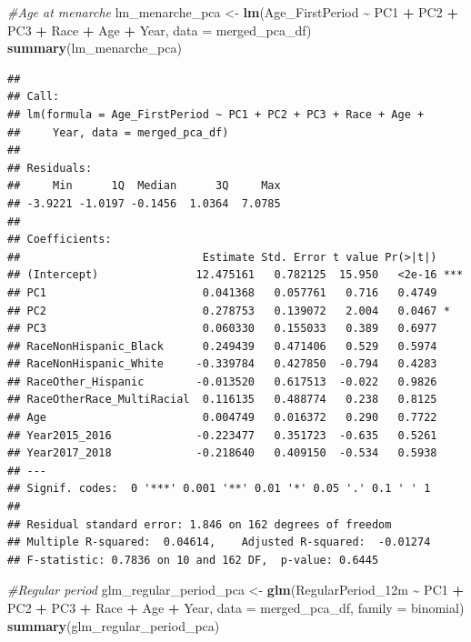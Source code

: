\documentclass[
]{article}
\newenvironment{Shaded}{\begin{snugshade}}{\end{snugshade}}
\newcommand{\AttributeTok}[1]{\textcolor[rgb]{0.13,0.29,0.53}{#1}}
\newcommand{\CommentTok}[1]{\textcolor[rgb]{0.56,0.35,0.01}{\textit{#1}}}
\newcommand{\FunctionTok}[1]{\textcolor[rgb]{0.13,0.29,0.53}{\textbf{#1}}}
\newcommand{\NormalTok}[1]{#1}
\newcommand{\OtherTok}[1]{\textcolor[rgb]{0.56,0.35,0.01}{#1}}
\newcommand{\SpecialCharTok}[1]{\textcolor[rgb]{0.81,0.36,0.00}{\textbf{#1}}}
\begin{document}
\begin{Shaded}
\begin{Highlighting}[]
\CommentTok{\#Age at menarche}
\NormalTok{lm\_menarche\_pca }\OtherTok{\textless{}{-}} \FunctionTok{lm}\NormalTok{(Age\_FirstPeriod }\SpecialCharTok{\textasciitilde{}}\NormalTok{ PC1 }\SpecialCharTok{+}\NormalTok{ PC2 }\SpecialCharTok{+}\NormalTok{ PC3 }\SpecialCharTok{+}\NormalTok{ Race }\SpecialCharTok{+}\NormalTok{ Age }\SpecialCharTok{+}\NormalTok{ Year, }
                                \AttributeTok{data =}\NormalTok{ merged\_pca\_df)}
\FunctionTok{summary}\NormalTok{(lm\_menarche\_pca)}
\end{Highlighting}
\end{Shaded}

\begin{verbatim}
## 
## Call:
## lm(formula = Age_FirstPeriod ~ PC1 + PC2 + PC3 + Race + Age + 
##     Year, data = merged_pca_df)
## 
## Residuals:
##     Min      1Q  Median      3Q     Max 
## -3.9221 -1.0197 -0.1456  1.0364  7.0785 
## 
## Coefficients:
##                            Estimate Std. Error t value Pr(>|t|)    
## (Intercept)               12.475161   0.782125  15.950   <2e-16 ***
## PC1                        0.041368   0.057761   0.716   0.4749    
## PC2                        0.278753   0.139072   2.004   0.0467 *  
## PC3                        0.060330   0.155033   0.389   0.6977    
## RaceNonHispanic_Black      0.249439   0.471406   0.529   0.5974    
## RaceNonHispanic_White     -0.339784   0.427850  -0.794   0.4283    
## RaceOther_Hispanic        -0.013520   0.617513  -0.022   0.9826    
## RaceOtherRace_MultiRacial  0.116135   0.488774   0.238   0.8125    
## Age                        0.004749   0.016372   0.290   0.7722    
## Year2015_2016             -0.223477   0.351723  -0.635   0.5261    
## Year2017_2018             -0.218640   0.409150  -0.534   0.5938    
## ---
## Signif. codes:  0 '***' 0.001 '**' 0.01 '*' 0.05 '.' 0.1 ' ' 1
## 
## Residual standard error: 1.846 on 162 degrees of freedom
## Multiple R-squared:  0.04614,    Adjusted R-squared:  -0.01274 
## F-statistic: 0.7836 on 10 and 162 DF,  p-value: 0.6445
\end{verbatim}

\begin{Shaded}
\begin{Highlighting}[]
\CommentTok{\#Regular period }
\NormalTok{glm\_regular\_period\_pca }\OtherTok{\textless{}{-}} \FunctionTok{glm}\NormalTok{(RegularPeriod\_12m }\SpecialCharTok{\textasciitilde{}}\NormalTok{ PC1 }\SpecialCharTok{+}\NormalTok{ PC2 }\SpecialCharTok{+}\NormalTok{ PC3 }\SpecialCharTok{+}\NormalTok{ Race }\SpecialCharTok{+}\NormalTok{ Age }\SpecialCharTok{+}\NormalTok{ Year, }
                                \AttributeTok{data =}\NormalTok{ merged\_pca\_df, }\AttributeTok{family =}\NormalTok{ binomial)}
\FunctionTok{summary}\NormalTok{(glm\_regular\_period\_pca)}
\end{Highlighting}
\end{Shaded}
\end{document}

